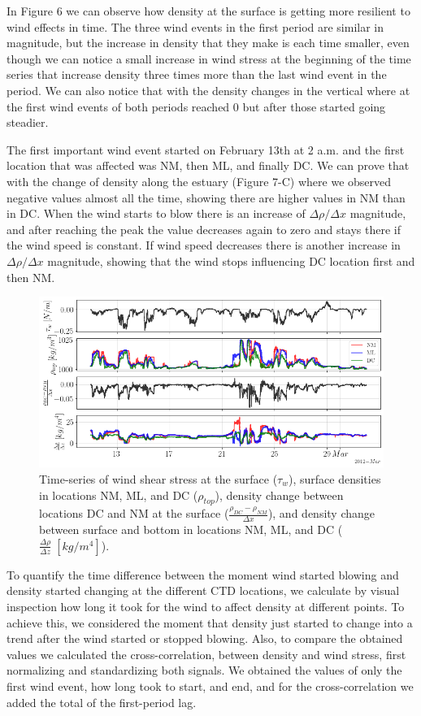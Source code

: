 \documentclass[tesis.tex]{subfiles}
\begin{document}
In Figure 6 we can observe how density at the surface is getting more resilient to wind effects in time. The three wind events in the first period are similar in magnitude, but the increase in density that they make is each time smaller, even though we can notice a small increase in wind stress at the beginning of the time series that increase density three times more than the last wind event in the period. We can also notice that with the density changes in the vertical where at the first wind events of both periods reached 0 but after those started going steadier.

The first important wind event started on February 13th at 2 a.m. and the first location that was affected was NM, then ML, and finally DC. We can prove that with the change of density along the estuary (Figure 7-C) where we observed negative values almost all the time, showing there are higher values in NM than in DC. When the wind starts to blow there is an increase of $\Delta \rho/\Delta x$ magnitude, and after reaching the peak the value decreases again to zero and stays there if the wind speed is constant. If wind speed decreases there is another increase in $\Delta \rho/\Delta x$ magnitude, showing that the wind stops influencing DC location first and then NM.

\begin{figure}[h!]
    \centering
    \includegraphics[width=\textwidth]{Imagenes/diff.png}
    \caption{Time-series of wind shear stress at the surface ($\tau_w$), surface densities in locations NM, ML, and DC ($\rho_{top}$), density change between locations DC and NM at the surface ($\frac{\rho_{DC}-\rho_{NM}}{\Delta x}$), and density change between surface and bottom in locations NM, ML, and DC ($\frac{\Delta \rho}{\Delta z} \; [kg/m^4]$).}
    \label{fig:diff}
\end{figure}

To quantify the time difference between the moment wind started blowing and density started changing at the different CTD locations, we calculate by visual inspection how long it took for the wind to affect density at different points. To achieve this, we considered the moment that density just started to change into a trend after the wind started or stopped blowing. Also, to compare the obtained values we calculated the cross-correlation, between density and wind stress, first normalizing and standardizing both signals. We obtained the values of only the first wind event, how long took to start, and end, and for the cross-correlation we added the total of the first-period lag.
\end{document}
